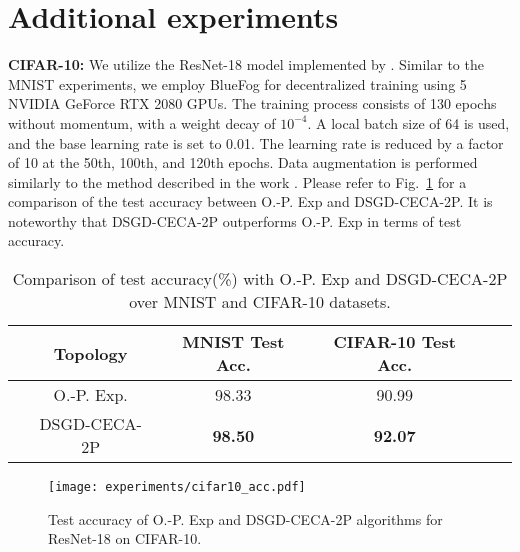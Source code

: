 \documentclass{article}
\theoremstyle{plain}
\theoremstyle{definition}
\begin{document}
\section{Additional experiments}\label{appendix: exp}
\textbf{CIFAR-10:} We utilize the ResNet-18 model \cite{he2016deep} implemented by \cite{kuangliu}. Similar to the MNIST experiments, we employ BlueFog for decentralized training using 5 NVIDIA GeForce RTX 2080 GPUs. The training process consists of 130 epochs without momentum, with a weight decay of $10^{-4}$. A local batch size of 64 is used, and the base learning rate is set to 0.01. The learning rate is reduced by a factor of 10 at the 50th, 100th, and 120th epochs. Data augmentation is performed similarly to the method described in the work \cite{kuangliu}. Please refer to Fig.~\ref{fig:cifar10} for a comparison of the test accuracy between O.-P. Exp and DSGD-CECA-2P. It is noteworthy that DSGD-CECA-2P outperforms O.-P. Exp in terms of test accuracy.





\setlength{\tabcolsep}{4pt}
\begin{table}[h!]
    \centering 
    \caption{\small Comparison of test accuracy(\%) with O.-P. Exp and DSGD-CECA-2P over MNIST and CIFAR-10 datasets.}
    \vspace{2mm}
	\begin{tabular}{rccccc}
		\toprule
		&\textbf{Topology} &  \textbf{MNIST Test Acc.} &\textbf{CIFAR-10 Test Acc.}\\ \midrule
		&O.-P. Exp.   &  98.33   & 90.99  \\  
            &DSGD-CECA-2P   & \textbf{98.50} &\textbf{92.07} \\
		\bottomrule
	\end{tabular}
	\label{table:deep_learning}
\end{table}

\begin{figure}[ht]
\vskip -0in
\begin{center}
\texttt{[image: experiments/cifar10\_acc.pdf]}
\caption{Test accuracy of O.-P. Exp and DSGD-CECA-2P algorithms for ResNet-18 on CIFAR-10.}
\label{fig:cifar10}
\end{center}
\vskip -0.45in
\end{figure}
\end{document}
